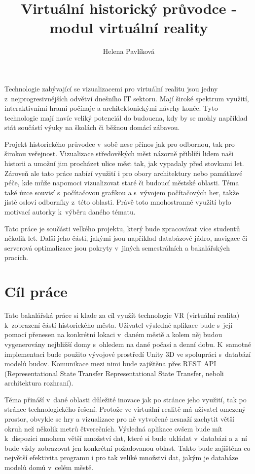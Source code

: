 \documentclass[thesis=B,czech]{FITthesis}[2012/06/26]
\title{Virtuální historický průvodce - modul virtuální reality}
\author{Helena Pavlíková} %
\begin{document}
\begin{introduction}
	Technologie zabývající se vizualizacemi pro virtuální realitu jsou jedny z~nejprogresivnějších odvětví dnešního IT sektoru. Mají široké spektrum využití, interaktivními hrami počínaje a architektonickými návrhy konče. Tyto technologie mají navíc veliký potenciál do budoucna, kdy by se mohly například stát součástí výuky na školách či běžnou domácí zábavou.

    Projekt historického průvodce v~sobě nese přínos jak pro odbornou, tak pro širokou veřejnost. Vizualizace středověkých měst názorně přiblíží lidem naši historii a umožní jim procházet ulice měst tak, jak vypadaly před stovkami let. Zároveň ale tato práce nabízí využití i pro obory architektury nebo památkové péče, kde může napomoci vizualizovat staré či budoucí městské oblasti. Téma také úzce souvisí s~počítačovou grafikou a s~vývojem počítačových her, takže jistě osloví odborníky z~této oblasti. Právě toto mnohostranné využití bylo motivací autorky k~výběru daného tématu.

    Tato práce je součásti velkého projektu, který bude zpracovávat více studentů několik let. Další jeho části, jakými jsou například databázové jádro, navigace či serverová optimalizace jsou pokryty v~jiných semestrálních a bakalářských pracích.

\end{introduction}

\chapter{Cíl práce}

Tato bakalářská práce si klade za cíl využít technologie VR (virtuální realita) k~zobrazení částí historického města. Uživatel výsledné aplikace bude s~její pomocí přenesen na konkrétní lokaci v~daném městě a kolem něj budou vygenerovány nejbližší domy s~ohledem na dané počasí a denní dobu.  K~samotné implementaci bude použito vývojové prostředí Unity 3D ve spolupráci s~databází modelů budov. Komunikace mezi nimi bude zajištěna přes REST API (Representational State Transfer Representational State Transfer, neboli architektura rozhraní).
    
	Téma přináší v~dané oblasti důležité inovace jak po stránce jeho využití, tak po stránce technologického řešení. Protože ve virtuální realitě má uživatel omezený prostor, obvykle se hry a vizualizace pro ně vytvořené nesnaží zachytit větší okruh než několik metrů čtverečních. Výsledná aplikace ovšem bude mít k~dispozici mnohem větší množství dat, které si bude ukládat v~databázi a z~ní bude vždy zobrazovat jen konkrétní požadovanou oblast. Takto bude zajištěna co největší efektivita programu i pro tak veliké množství dat, jakým je databáze modelů domů v~celém městě.
	
\end{document}
